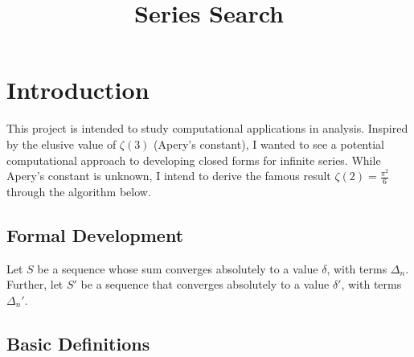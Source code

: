 \documentclass{article}
\title{Series Search}
\begin{document}
\maketitle

\section{Introduction}
This project is intended to study computational applications in analysis. 
Inspired by the elusive value of $\zeta (3)$ (Apery's constant), 
I wanted to see a potential computational approach to developing closed forms for infinite series. 
While Apery's constant is unknown, I intend to derive the famous result $\zeta (2) = \frac{{\pi}^2}{6}$ 
through the algorithm below. 

\subsection{Formal Development}

Let $S$ be a sequence whose sum converges absolutely to a value $\delta$, with terms $\Delta_n$. 
Further, let $S'$ be a sequence that converges absolutely to a value $\delta'$, with terms $\Delta_n'$. 

\subsection{Basic Definitions}
\end{document}
